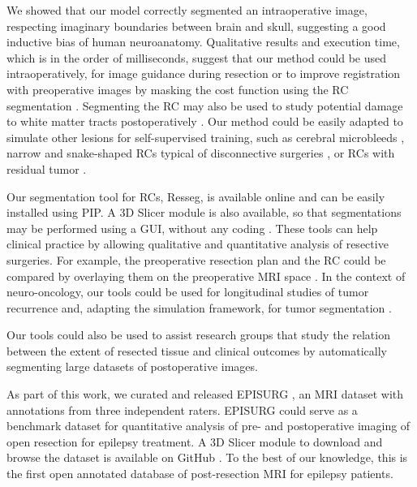 We showed that our model correctly segmented an intraoperative image, respecting imaginary boundaries between brain and skull, suggesting a good inductive bias of human neuroanatomy.
Qualitative results and execution time, which is in the order of milliseconds, suggest that our method could be used intraoperatively, for image guidance during resection or to improve registration with preoperative images by masking the cost function using the \ac{RC} segmentation \cite{brett_spatial_2001}.
Segmenting the \ac{RC} may also be used to study potential damage to white matter tracts postoperatively \cite{winston_optic_2012}.
Our method could be easily adapted to simulate other lesions for self-supervised training, such as cerebral microbleeds \cite{cuadrado-godia_cerebral_2018}, narrow and snake-shaped \acp{RC} typical of disconnective surgeries \cite{mohamed_temporoparietooccipital_2011}, or \acp{RC} with residual tumor \cite{meier_automatic_2017}.

Our segmentation tool for \acp{RC}, Resseg, is available online%
and can be easily installed using \ac{PIP}.
A 3D Slicer module is also available, so that segmentations may be performed using a \ac{GUI}, without any coding%
.
These tools can help clinical practice by allowing qualitative and quantitative analysis of resective surgeries.
For example, the preoperative resection plan and the \ac{RC} could be compared by overlaying them on the preoperative \ac{MRI} space \cite{nowell_utility_2015,nowell_resection_2017}.
In the context of neuro-oncology, our tools could be used for longitudinal studies of tumor recurrence \cite{meier_automatic_2017} and, adapting the simulation framework, for tumor segmentation \cite{zhang_self-supervised_2021}.

Our tools could also be used to assist research groups that study the relation between the extent of resected tissue and clinical outcomes \cite{taylor_impact_2018,galovic_association_2019} by automatically segmenting large datasets of postoperative images.

As part of this work, we curated and released EPISURG \cite{perez-garcia_episurg_2020}, an \ac{MRI} dataset with annotations from three independent raters.
EPISURG could serve as a benchmark dataset for quantitative analysis of pre- and postoperative imaging of open resection for epilepsy treatment.
A 3D Slicer module to download and browse the dataset is available on GitHub%
.
To the best of our knowledge, this is the first open annotated database of post-resection \ac{MRI} for epilepsy patients.
